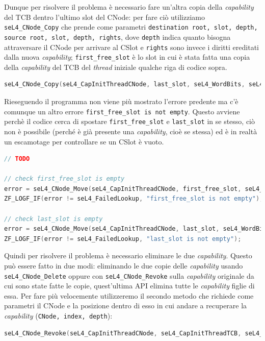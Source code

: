 Dunque per risolvere il problema è necessario fare un'altra copia della \textit{capability} del TCB dentro l'ultimo slot del CNode: per fare ciò utilizziamo \texttt{seL4\_CNode\_Copy} che prende come parametri \texttt{destination root, slot, depth, source root, slot, depth, rights}, dove \texttt{depth} indica quanto bisogna attraversare il CNode per arrivare al CSlot e \texttt{rights} sono invece i diritti ereditati dalla nuova \textit{capability}; \texttt{first\_free\_slot} è lo slot in cui è stata fatta una copia della \textit{capability} del TCB del \textit{thread} iniziale qualche riga di codice sopra.
\begin{lstlisting}[language=C++]
seL4_CNode_Copy(seL4_CapInitThreadCNode, last_slot, seL4_WordBits, seL4_CapInitThreadCNode, first_free_slot, seL4_WordBits, seL4_AllRights);
\end{lstlisting}

Rieseguendo il programma non viene più mostrato l'errore predente ma c'è comunque un altro errore \texttt{first\_free\_slot is not empty}. Questo avviene perchè il codice cerca di spostare \texttt{first\_free\_slot} e \texttt{last\_slot} in se stesso, ciò non è possibile (perché è già presente una \textit{capability}, cioè se stessa) ed è in realtà un escamotage per controllare se un CSlot è vuoto.
\begin{lstlisting}[language=C++]
// TODO 
         
// check first_free_slot is empty
error = seL4_CNode_Move(seL4_CapInitThreadCNode, first_free_slot, seL4_WordBits, seL4_CapInitThreadCNode, first_free_slot, seL4_WordBits);
ZF_LOGF_IF(error != seL4_FailedLookup, "first_free_slot is not empty");

// check last_slot is empty
error = seL4_CNode_Move(seL4_CapInitThreadCNode, last_slot, seL4_WordBits, seL4_CapInitThreadCNode, last_slot, seL4_WordBits);
ZF_LOGF_IF(error != seL4_FailedLookup, "last_slot is not empty");
\end{lstlisting}

Quindi per risolvere il problema è necessario eliminare le due \textit{capability}. Questo può essere fatto in due modi: eliminando le due copie delle \textit{capability} usando \texttt{seL4\_CNode\_Delete} oppure con \texttt{seL4\_CNode\_Revoke} sulla \textit{capability} originale da cui sono state fatte le copie, quest'ultima API elimina tutte le \textit{capability} figlie di essa. Per fare più velocemente utilizzeremo il secondo metodo che richiede come parametri il CNode e la posizione dentro di esso in cui andare a recuperare la \textit{capability} (\texttt{CNode, index, depth}):
\begin{lstlisting}[language=C++]
seL4_CNode_Revoke(seL4_CapInitThreadCNode, seL4_CapInitThreadTCB, seL4_WordBits);
\end{lstlisting}


